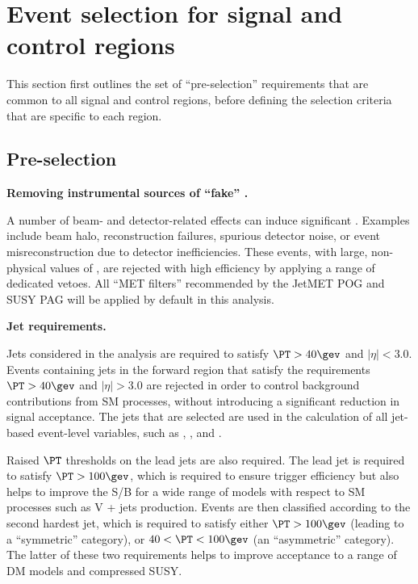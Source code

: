 \section{Event selection for signal and control regions}
\label{sec:selection}

This section first outlines the set of ``pre-selection'' requirements
that are common to all signal and control regions, before defining the
selection criteria that are specific to each region.

\subsection{Pre-selection}
\label{sec:preSelection}

{\bf Removing instrumental sources of ``fake'' \met.} 

A number of beam- and detector-related effects can induce significant
\met. Examples include beam halo, reconstruction failures, spurious
detector noise, or event misreconstruction due to detector
inefficiencies. These events, with large, non-physical values of \met,
are rejected with high efficiency by applying a range of dedicated
vetoes. All ``MET filters'' recommended by the JetMET POG and SUSY PAG
will be applied by default in this analysis.

{\bf Jet requirements.} 

Jets considered in the analysis are required to satisfy $\PT>40\gev$
and $|\eta|<3.0$. Events containing jets in the forward region that
satisfy the requirements $\PT>40\gev$ and $|\eta|>3.0$ are rejected in
order to control background contributions from SM processes, without
introducing a significant reduction in signal acceptance. The jets
that are selected are used in the calculation of all jet-based
event-level variables, such as \HT, \mht, and \alphat.

Raised $\PT$ thresholds on the lead jets are also required. The lead
jet is required to satisfy $\PT > 100\gev$, which is required to
ensure trigger efficiency but also helps to improve the S/B for a wide
range of models with respect to SM processes such as V + jets
production. Events are then classified according to the second hardest
jet, which is required to satisfy either $\PT > 100\gev$ (leading to a
``symmetric'' \njet category), or $40 < \PT < 100\gev$ (an
``asymmetric'' \njet category). The latter of these two requirements
helps to improve acceptance to a range of DM models and compressed
SUSY.

